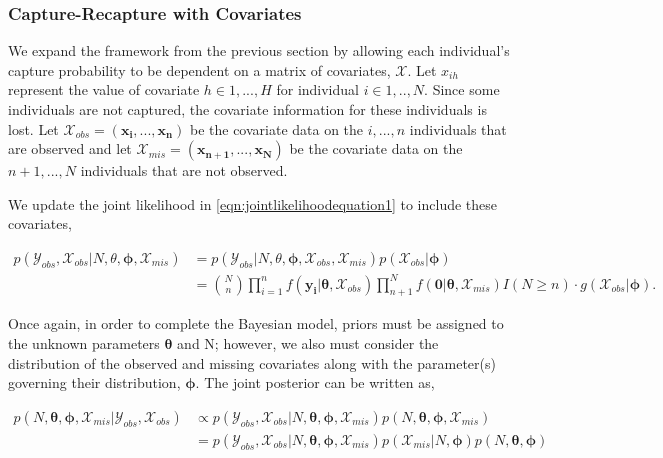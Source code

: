 \documentclass[
  12pt,
]{article}
\begin{document}
\subsubsection{Capture-Recapture with Covariates}
\label{sec:CRwithcovariates}

We expand the framework from the previous section by allowing each
individual's capture probability to be dependent on a matrix of
covariates, \(\mathcal{X}\). Let \(x_{ih}\) represent the value of
covariate \(h \in 1,...,H\) for individual \(i \in 1,..,N\). Since some
individuals are not captured, the covariate information for these
individuals is lost. Let
\(\mathcal{X}_{obs}=(\boldsymbol{x_i},...,\boldsymbol{x_n})\) be the
covariate data on the \(i,...,n\) individuals that are observed and let
\(\mathcal{X}_{mis}=(\boldsymbol{x_{n+1}},...,\boldsymbol{x_N})\) be the
covariate data on the \(n+1,...,N\) individuals that are not observed.

We update the joint likelihood in \autoref{eqn:jointlikelihoodequation1}
to include these covariates,

\begin{align}
\label{eqn:jointlikelihoodequation2}
\nonumber p(\mathcal{Y}_{obs},\mathcal{X}_{obs}|N,\theta,\boldsymbol{\phi},\mathcal{X}_{mis}) & = p(\mathcal{Y}_{obs}|N,\theta,\boldsymbol{\phi},\mathcal{X}_{obs},\mathcal{X}_{mis})p(\mathcal{X}_{obs}|\boldsymbol{\phi})\\
& = \binom{N}{n} \prod_{i=1}^n f(\boldsymbol{y_i}|\boldsymbol{\theta},\mathcal{X}_{obs})\prod_{n+1}^N f(\boldsymbol{0}|\boldsymbol{\theta},\mathcal{X}_{mis})I(N\ge n)\cdot g(\mathcal{X}_{obs}|\boldsymbol{\phi}).
\end{align}

Once again, in order to complete the Bayesian model, priors must be
assigned to the unknown parameters \(\boldsymbol{\theta}\) and N;
however, we also must consider the distribution of the observed and
missing covariates along with the parameter(s) governing their
distribution, \(\boldsymbol{\phi}\). The joint posterior can be written
as,

\begin{align}
\label{eqn:fullposteriorderive}
\nonumber p(N,\boldsymbol{\theta},\boldsymbol{\phi},\mathcal{X}_{mis}|\mathcal{Y}_{obs},\mathcal{X}_{obs}) & \propto p(\mathcal{Y}_{obs},\mathcal{X}_{obs}|N,\boldsymbol{\theta},\boldsymbol{\phi},\mathcal{X}_{mis})p(N,\boldsymbol{\theta},\boldsymbol{\phi},\mathcal{X}_{mis}) \\
& = p(\mathcal{Y}_{obs},\mathcal{X}_{obs}|N,\boldsymbol{\theta},\boldsymbol{\phi},\mathcal{X}_{mis})p(\mathcal{X}_{mis}|N,\boldsymbol{\phi})p(N,\boldsymbol{\theta},\boldsymbol{\phi})
\end{align}
\end{document}
